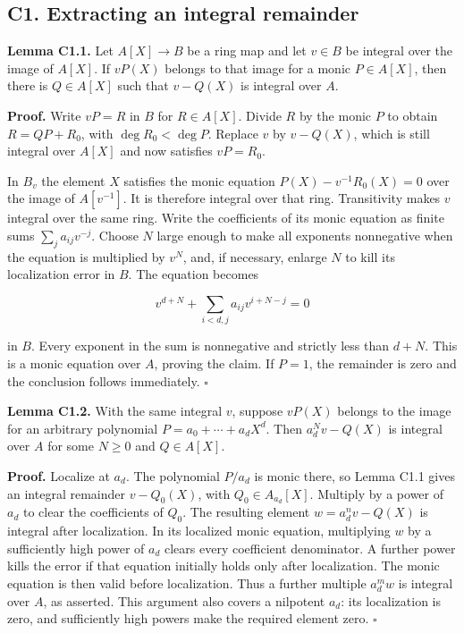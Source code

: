 \documentclass[11pt,a4paper,openany]{report}
\begin{document}
\subsection{C1. Extracting an integral remainder}\label{AG-RG-S04-c1.-extracting-an-integral-remainder}

\textbf{Lemma C1.1.} Let \(A[X]\to B\) be a ring map and let \(v\in B\) be integral over the image of \(A[X]\). If \(vP(X)\) belongs to that image for a monic \(P\in A[X]\), then there is \(Q\in A[X]\) such that \(v-Q(X)\) is integral over \(A\).

\textbf{Proof.} Write \(vP=R\) in \(B\) for \(R\in A[X]\). Divide \(R\) by the monic \(P\) to obtain \(R=QP+R_0\), with \(\deg R_0<\deg P\). Replace \(v\) by \(v-Q(X)\), which is still integral over \(A[X]\) and now satisfies \(vP=R_0\).

In \(B_v\) the element \(X\) satisfies the monic equation \(P(X)-v^{-1}R_0(X)=0\) over the image of \(A[v^{-1}]\). It is therefore integral over that ring. Transitivity makes \(v\) integral over the same ring. Write the coefficients of its monic equation as finite sums \(\sum_j a_{ij}v^{-j}\). Choose \(N\) large enough to make all exponents nonnegative when the equation is multiplied by \(v^N\), and, if necessary, enlarge \(N\) to kill its localization error in \(B\). The equation becomes

\[
v^{d+N}+\sum_{i<d,j}a_{ij}v^{i+N-j}=0
\]

in \(B\). Every exponent in the sum is nonnegative and strictly less than \(d+N\). This is a monic equation over \(A\), proving the claim. If \(P=1\), the remainder is zero and the conclusion follows immediately. \(\square\)

\textbf{Lemma C1.2.} With the same integral \(v\), suppose \(vP(X)\) belongs to the image for an arbitrary polynomial \(P=a_0+\cdots+a_dX^d\). Then \(a_d^Nv-Q(X)\) is integral over \(A\) for some \(N\ge0\) and \(Q\in A[X]\).

\textbf{Proof.} Localize at \(a_d\). The polynomial \(P/a_d\) is monic there, so Lemma C1.1 gives an integral remainder \(v-Q_0(X)\), with \(Q_0\in A_{a_d}[X]\). Multiply by a power of \(a_d\) to clear the coefficients of \(Q_0\). The resulting element \(w=a_d^nv-Q(X)\) is integral after localization. In its localized monic equation, multiplying \(w\) by a sufficiently high power of \(a_d\) clears every coefficient denominator. A further power kills the error if that equation initially holds only after localization. The monic equation is then valid before localization. Thus a further multiple \(a_d^mw\) is integral over \(A\), as asserted. This argument also covers a nilpotent \(a_d\): its localization is zero, and sufficiently high powers make the required element zero. \(\square\)
\end{document}
